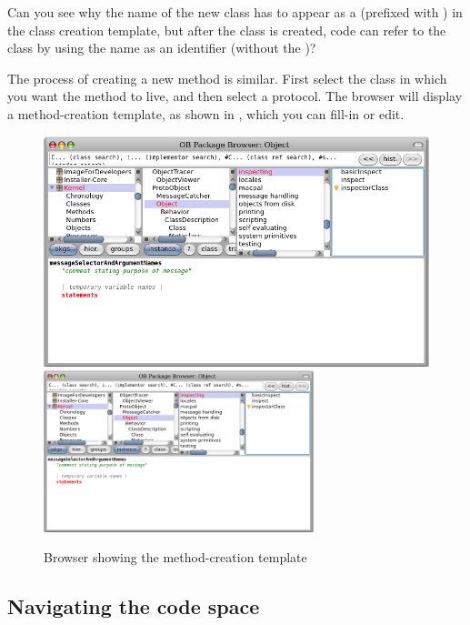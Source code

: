 \documentclass[a4paper,10pt,twoside]{book}
\begin{document}
Can you see why the name of the new class has to appear as a  (\ie prefixed with \ct{#}) in the class creation template, but after the class is created, code can refer to the class by using the name as an identifier (\ie without the \ct{#})?

The process of creating a new method is similar.  First select the class in which you want the method to live, and then select a protocol.  The browser will display a method-creation template, as shown in , which you can fill-in or edit.

\begin{figure}[htbp]
   \centering
   \ifluluelse
	   {\includegraphics [width=\textwidth]{SystemBrowserMethodTemplate}}
	   {\includegraphics[width=0.7\textwidth]{SystemBrowserMethodTemplate}}
   \caption{Browser showing the method-creation template
   }
\end{figure}

\subsection{Navigating the code space}
\end{document}
